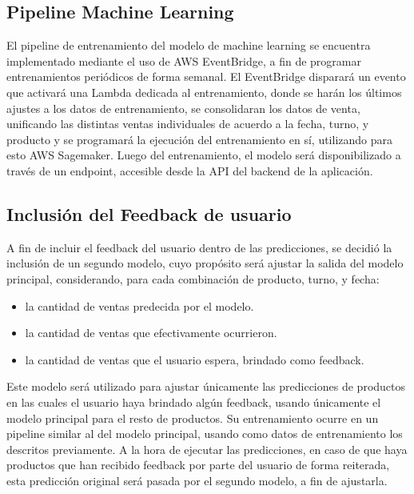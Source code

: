 \subsection{Pipeline Machine Learning}\label{sec:pipeline-machine-learning}

El pipeline de entrenamiento del modelo de machine learning se encuentra implementado mediante el uso de AWS EventBridge, a fin de programar entrenamientos periódicos de forma semanal. El EventBridge disparará un evento que activará una Lambda dedicada al entrenamiento, donde se harán los últimos ajustes a los datos de entrenamiento, se consolidaran los datos de venta, unificando las distintas ventas individuales de acuerdo a la fecha, turno, y producto y se programará la ejecución del entrenamiento en sí, utilizando para esto AWS Sagemaker. Luego del entrenamiento, el modelo será disponibilizado a través de un endpoint, accesible desde la API del backend de la aplicación.

\subsection{Inclusión del Feedback de usuario}\label{sec:inclusion-feedback-usuario}

A fin de incluir el feedback del usuario dentro de las predicciones, se decidió la inclusión de un segundo modelo, cuyo propósito será ajustar la salida del modelo principal, considerando, para cada combinación de producto, turno, y fecha: 

\begin{itemize}
    \item la cantidad de ventas predecida por el modelo.
    \item la cantidad de ventas que efectivamente ocurrieron.
    \item la cantidad de ventas que el usuario espera, brindado como feedback.
\end{itemize}

Este modelo será utilizado para ajustar únicamente las predicciones de productos en las cuales el usuario haya brindado algún feedback, usando únicamente el modelo principal para el resto de productos. Su entrenamiento ocurre en un pipeline similar al del modelo principal, usando como datos de entrenamiento los descritos previamente. A la hora de ejecutar las predicciones, en caso de que haya productos que han recibido feedback por parte del usuario de forma reiterada, esta predicción original será pasada por el segundo modelo, a fin de ajustarla.
